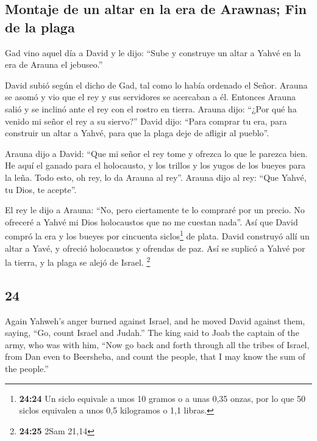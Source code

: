 \begin{paracol}{2}
\hypertarget{montaje-de-un-altar-en-la-era-de-arawnas-fin-de-la-plaga}{%
\subsection{Montaje de un altar en la era de Arawnas; Fin de la
plaga}\label{montaje-de-un-altar-en-la-era-de-arawnas-fin-de-la-plaga}}

 Gad vino aquel día a David y le dijo: ``Sube y construye
un altar a Yahvé en la era de Arauna el jebuseo.''

 David subió según el dicho de Gad, tal como lo había
ordenado el Señor.  Arauna se asomó y vio que el rey y
sus servidores se acercaban a él. Entonces Arauna salió y se inclinó
ante el rey con el rostro en tierra.  Arauna dijo: ``¿Por
qué ha venido mi señor el rey a su siervo?'' David dijo: ``Para comprar
tu era, para construir un altar a Yahvé, para que la plaga deje de
afligir al pueblo''.

 Arauna dijo a David: ``Que mi señor el rey tome y
ofrezca lo que le parezca bien. He aquí el ganado para el holocausto, y
los trillos y los yugos de los bueyes para la leña.  Todo
esto, oh rey, lo da Arauna al rey''. Arauna dijo al rey: ``Que Yahvé, tu
Dios, te acepte''.

 El rey le dijo a Arauna: ``No, pero ciertamente te lo
compraré por un precio. No ofreceré a Yahvé mi Dios holocaustos que no
me cuestan nada''. Así que David compró la era y los bueyes por
cincuenta siclos\footnote{\textbf{24:24} Un siclo equivale a unos 10
  gramos o a unas 0,35 onzas, por lo que 50 siclos equivalen a unos 0,5
  kilogramos o 1,1 libras.} de plata.  David construyó
allí un altar a Yavé, y ofreció holocaustos y ofrendas de paz. Así se
suplicó a Yahvé por la tierra, y la plaga se alejó de Israel.
\footnote{\textbf{24:25} 2Sam 21,14} \switchcolumn
\begin{otherlanguage}{english}

\hypertarget{section-47}{%
\section{24}\label{section-47}}

 Again Yahweh's anger burned against Israel, and he moved
David against them, saying, ``Go, count Israel and Judah.''
 The king said to Joab the captain of the army, who was
with him, ``Now go back and forth through all the tribes of Israel, from
Dan even to Beersheba, and count the people, that I may know the sum of
the people.''


\end{otherlanguage}
\end{paracol}
